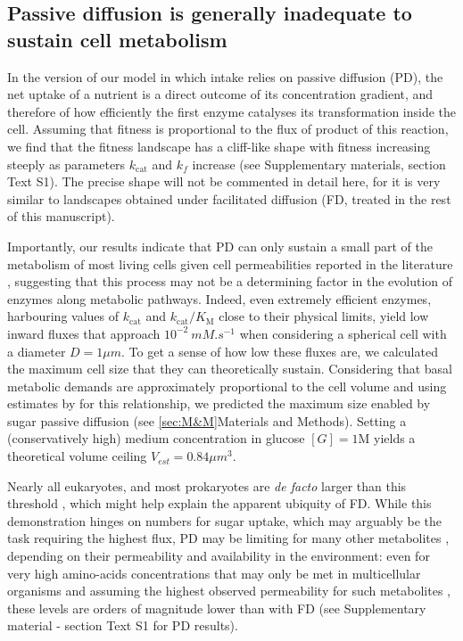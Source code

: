 \documentclass[11pt,onecolumn]{article}
\providecommand{\DIFdel}[1]{{\protect\color{red} \scriptsize #1}} %
\providecommand{\DIFdelbegin}{} %
\providecommand{\DIFdelend}{} %
\begin{document}
\subsection{Passive diffusion is generally inadequate to sustain cell metabolism}

In the version of our model in which intake relies on passive diffusion (PD), the net uptake of a nutrient is a direct outcome of its concentration gradient, and therefore of how efficiently the first enzyme catalyses its transformation inside the cell. Assuming that fitness is proportional to the flux of product of this reaction, we find that the fitness landscape has a cliff-like shape with fitness increasing steeply as parameters $k_\text{cat}$ and $k_f$ increase (see Supplementary materials, section Text S1). The precise shape will not be commented in detail here, for it is very similar to landscapes obtained under facilitated diffusion (FD, treated in the rest of this manuscript). 

Importantly, our results indicate that PD can only sustain a small part of the metabolism of most living cells given cell permeabilities reported in the literature \citep{Wood68,Milo10}, suggesting that this process may not be a determining factor in the evolution of enzymes along metabolic pathways. Indeed, even extremely efficient enzymes, harbouring values of $k_\text{cat}$ and $k_\text{cat}/K_\text{M}$ close to their physical limits, yield low inward fluxes that approach $10^{-2}~mM.s^{-1}$ when considering a spherical cell with a diameter $D=1 \mu m$. To get a sense of how low these fluxes are, we calculated the maximum cell size \DIFdelbegin \DIFdel{that }\DIFdelend they can theoretically sustain. Considering that basal metabolic demands are approximately proportional to the cell volume and using estimates by \citet{Lynch15} for this relationship, we predicted the maximum size enabled by sugar passive diffusion (see \ref{sec:M&M}Materials and Methods). Setting a (conservatively high) medium concentration in glucose $[G]=1$M yields a theoretical volume ceiling $V_{est}=0.84 \mu m^3$. 

Nearly all eukaryotes, and most prokaryotes are \textit{de facto} larger than this threshold \citep{Heim17}, which might help explain the apparent ubiquity of FD. While this demonstration hinges on numbers for sugar uptake, which may arguably be the task requiring the highest flux, PD may be limiting for many other metabolites \citep{Boer10}, depending on their permeability and availability in the environment: even for very high amino-acids concentrations that may only be met in multicellular organisms \citep{Schmidt16} and assuming the highest observed permeability for such metabolites \citep{Chakrabarti94}, these levels are orders of magnitude lower than with FD (see Supplementary material - section Text S1 for PD results). 
\end{document}
